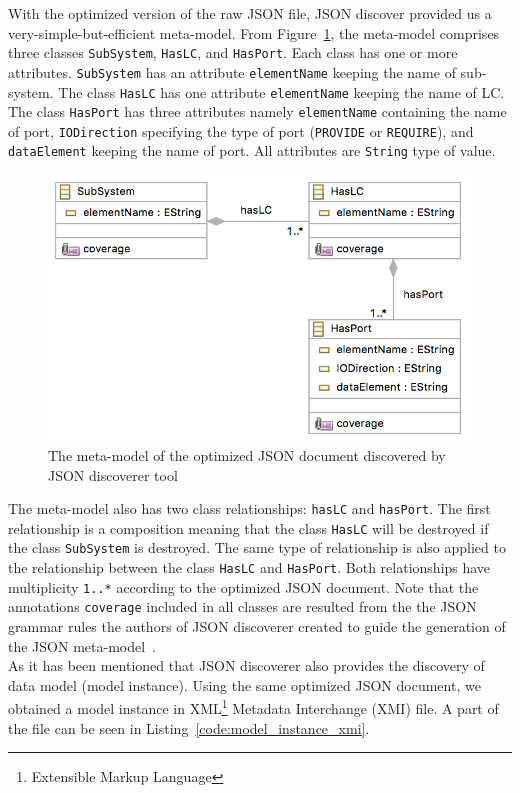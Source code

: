 With the optimized version of the raw JSON file, JSON discover provided us a very-simple-but-efficient meta-model. From Figure~\ref{fig:new_metamodel}, the meta-model comprises three classes \texttt{SubSystem}, \texttt{HasLC}, and \texttt{HasPort}. Each class has one or more attributes. \texttt{SubSystem} has an attribute \texttt{elementName} keeping the name of sub-system. The class \texttt{HasLC} has one attribute \texttt{elementName} keeping the name of LC. The class \texttt{HasPort} has three attributes namely \texttt{elementName} containing the name of port, \texttt{IODirection} specifying the type of port (\texttt{PROVIDE} or \texttt{REQUIRE}), and \texttt{dataElement} keeping the name of port. All attributes are \texttt{String} type of value.

\begin{figure}[H]
\centering
\captionsetup{justification=centering}
\vspace{0cm}%
\includegraphics[width=0.65\linewidth]{figure/new_model/new_metamodel.png}
\caption{The meta-model of the optimized JSON document discovered by JSON discoverer tool}
\label{fig:new_metamodel}
\end{figure}

The meta-model also has two class relationships: \texttt{hasLC} and \texttt{hasPort}. The first relationship is a composition meaning that the class \texttt{HasLC} will be destroyed if the class \texttt{SubSystem} is destroyed. The same type of relationship is also applied to the relationship between the class \texttt{HasLC} and \texttt{HasPort}. Both relationships have multiplicity \texttt{1..*} according to the optimized JSON document. Note that the annotations \texttt{coverage} included in all classes are resulted from the the JSON grammar rules the authors of JSON discoverer created to guide the generation of the JSON meta-model~\cite{Canovas}. \\

As it has been mentioned that JSON discoverer also provides the discovery of data model (model instance). Using the same optimized JSON document, we obtained a model instance in XML\footnote{Extensible Markup Language} Metadata Interchange (XMI) file. A part of the file can be seen in Listing~\ref{code:model_instance_xmi}.

